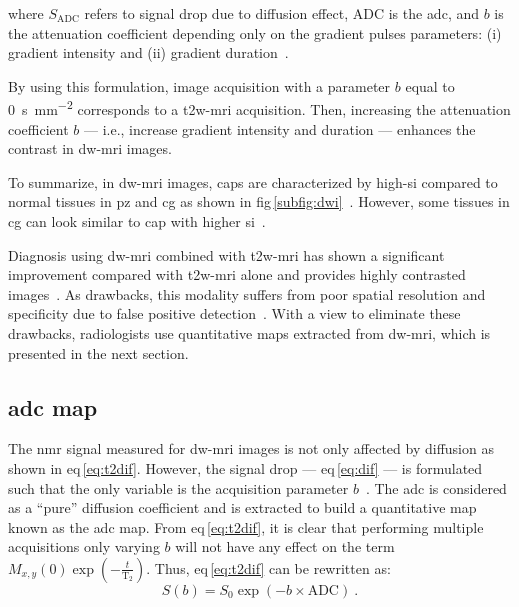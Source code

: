 \noindent where $S_{\text{ADC}}$ refers to signal drop due to diffusion effect, $\text{ADC}$ is the \acl{adc}, and $b$ is the attenuation coefficient depending only on the gradient pulses parameters: (i) gradient intensity and (ii) gradient duration~\cite{LeBihan1986}.

By using this formulation, image acquisition with a parameter $b$ equal to \SI{0}{\second\per\milli\metre\squared} corresponds to a \ac{t2w}-\ac{mri} acquisition.
Then, increasing the attenuation coefficient $b$ --- i.e., increase gradient intensity and duration --- enhances the contrast in \ac{dw}-\ac{mri} images.

To summarize, in \ac{dw}-\ac{mri} images, \acp{cap} are characterized by high-\ac{si} compared to normal tissues in \ac{pz} and \ac{cg} as shown in \acs{fig}\,\ref{subfig:dwi}~\cite{Barentsz2012}.
However, some tissues in \ac{cg} can look similar to \ac{cap} with higher \ac{si}~\cite{Barentsz2012}.

Diagnosis using \ac{dw}-\ac{mri} combined with \ac{t2w}-\ac{mri} has shown a significant improvement compared with \ac{t2w}-\ac{mri} alone and provides highly contrasted images~\cite{Shimofusa2005,Padhani2011,Choi2007}.
As drawbacks, this modality suffers from poor spatial resolution and specificity due to false positive detection~\cite{Choi2007}.
With a view to eliminate these drawbacks, radiologists use quantitative maps extracted from \ac{dw}-\ac{mri}, which is presented in the next section.

\subsection{\acs*{adc} map}\label{subsec:chp2:imaging:adc} 
The \ac{nmr} signal measured for \ac{dw}-\ac{mri} images is not only affected by diffusion as shown in \acs{eq}\,\eqref{eq:t2dif}.
However, the signal drop --- \acs{eq}\,\eqref{eq:dif} --- is formulated such that the only variable is the acquisition parameter $b$~\cite{LeBihan1986}.
The \ac{adc} is considered as a ``pure'' diffusion coefficient and is extracted to build a quantitative map known as the \acs{adc} map.
From \acs{eq}\,\eqref{eq:t2dif}, it is clear that performing multiple acquisitions only varying $b$ will not have any effect on the term  $M_{x,y}(0) \exp \left( - \frac{t}{\text{T}_2} \right)$.
Thus, \acs{eq}\,\eqref{eq:t2dif} can be rewritten as:
\begin{equation}
	S(b) = S_0 \exp \left( -b \times \text{ADC} \right) \ .
	\label{eq:t2adcrew}
\end{equation}

